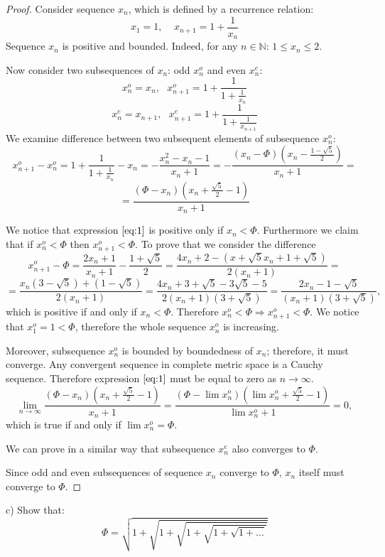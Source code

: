 \documentclass{article}
\begin{document}
\begin{proof}
Consider sequence $x_n$, which is defined by a recurrence relation:
$$ x_1 = 1, \>\>\>\>\> x_{n+1} = 1+\frac{1}{x_n} $$
Sequence $x_n$ is positive and bounded. Indeed, for any $n \in \mathbb{N}$: $1 \leq x_n \leq 2 $.

Now consider two subsequences of $x_n$: odd $x^o_n$ and even $x^e_n$:
$$ x^o_n = x_n, \>\>\> x^o_{n+1} = 1+\frac{1}{1+\frac{1}{x_n}} $$
$$ x^e_n = x_{n+1}, \>\>\> x^e_{n+1} = 1 + \frac{1}{1+\frac{1}{x_{n+1}}} $$
We examine difference between two subsequent elements of subsequence $x^o_{n}$:
$$ x^o_{n+1} - x^o_{n} = 1+\frac{1}{1+\frac{1}{x_n}} - x_n = - \frac{x_n^2 - x_n - 1}{x_n + 1} = -\frac{(x_n-\Phi)(x_n-\frac{1-\sqrt{5}}{2})}{x_n+1} = $$
\begin{equation} \label{eq:1}
= \frac{(\Phi-x_n)(x_n+\frac{\sqrt{5}}{2}-1)}{x_n+1}
\end{equation}

We notice that expression $\ref{eq:1}$ is positive only if $x_n < \Phi$. Furthermore we claim that if $x^o_n < \Phi$ then $x^o_{n+1} < \Phi$. To prove that we consider the difference 
$$ x^o_{n+1} - \Phi = \frac{2x_n+1}{x_n+1} - \frac{1+\sqrt{5}}{2} = \frac{4x_n+2-(x+\sqrt{5}x_n + 1 + \sqrt{5})}{2(x_n+1)} = $$
$$ = \frac{x_n(3-\sqrt{5})+(1-\sqrt{5})}{2(x_n+1)} = \frac{4x_n + 3 + \sqrt{5} - 3\sqrt{5}-5}{2(x_n+1)(3+\sqrt{5})} = \frac{2x_n-1-\sqrt{5}}{(x_n+1)(3+\sqrt{5})}, $$
which is positive if and only if $x_n < \Phi$. Therefore $x^o_n < \Phi \Rightarrow x^o_{n+1} < \Phi$. We notice that $x^o_1 = 1 < \Phi$, therefore the whole sequence $x^o_n$ is increasing.

Moreover, subsequence $x^o_n$ is bounded by boundedness of $x_n$; therefore, it must converge. Any convergent sequence in complete metric space is a Cauchy sequence. Therefore expression $\ref{eq:1}$ must be equal to zero as $n \to \infty$.
$$ \lim_{n \to \infty} \frac{(\Phi-x_n)(x_n+\frac{\sqrt{5}}{2}-1)}{x_n+1} = \frac{(\Phi-\lim x^o_n)(\lim x^o_n+\frac{\sqrt{5}}{2}-1)}{\lim x^o_n+1} = 0, $$
which is true if and only if $\lim x^o_n = \Phi$.

We can prove in a similar way that subsequence $x^e_n$ also converges to $\Phi$.

Since odd and even subsequences of sequence $x_n$ converge to $\Phi$, $x_n$ itself must converge to $\Phi$.

\end{proof}

\begin{tcolorbox}
c) Show that:
$$ \Phi = \sqrt{1+\sqrt{1+\sqrt{1+\sqrt{1+\sqrt{1+\dots}}}}} $$
\end{tcolorbox}
\end{document}
